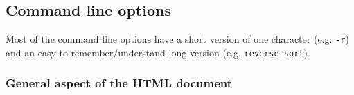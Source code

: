 \documentclass[11pt,a4paper]{article}
\newcommand{\mm}{\symbol{45}\symbol{45}}
\begin{document}

\subsection{Command line options}

Most of the command line options have a short version of one character
(e.g. \texttt{-r}) and an easy-to-remember/understand long version 
(e.g. \texttt{\mm{}reverse-sort}).

\subsubsection{General aspect of the HTML document}
\end{document}
